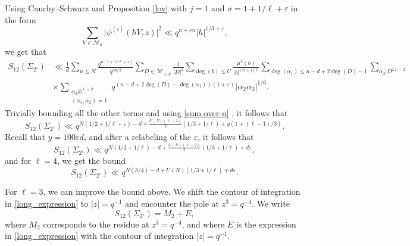 \documentclass[12pt]{amsart}
\begin{document}
Using Cauchy--Schwarz and Proposition \ref{lov} with $j=1$ and  $\sigma=1+1/\ell+\varepsilon$ in the form
$$ \sum_{V \in \mathcal{M}_n} \Big| \psi^{(i)}(hV, z)\Big|^2 \ll  q^{n+\varepsilon n} |h|^{1/3+\varepsilon},$$
we get that 
\begin{align*}
S_{12}(\Sigma_{2'}) & \ll \frac{1}{d} \sum_{n \leq N} \frac{q^{n (1+1/\ell+\varepsilon)}}{q^{3n/2}} \sum_{D \in \mathcal{M}_{\leq y}} \frac{1}{|D|^2} \sum_{\deg(b) \leq U} \frac{\mu^2(b)}{|b|^{1/2+1/\ell}} \sum_{\deg(\alpha_1) \leq n-d+2\deg(D)-1} \sum_{\alpha_2|D^{2\ell-2}} \nonumber  \\
& \times \sum_{\substack{\alpha_3|b^{\ell-2} \\ (\alpha_3,\alpha_2)=1}}  q^{(n-d+2\deg(D)-\deg(\alpha_1))(1+\varepsilon) } |\alpha_2\alpha_3|^{1/6}.
\end{align*}
Trivially bounding all the other terms and using \eqref{sum-over-n} , it follows that
\begin{equation*}
S_{12}(\Sigma_{2'}) \ll q^{N(1/2+1/\ell+\varepsilon)-d+ \frac{U(N)(\ell-2)}{2}( 1/3+1/\ell) +  y(1+(\ell-1) /3)}.
\end{equation*}
Recall that $y=100\varepsilon d$, and after a relabeling of the $\varepsilon$, it follows that
\begin{equation}
S_{12}(\Sigma_{2'}) \ll q^{N(1/2+1/\ell)-d+ \frac{U(N)(\ell-2)}{2}( 1/3+1/\ell) + d \varepsilon},
\label{ssigma3}
\end{equation}
and for $\ell=4$, we get the bound
\begin{equation*}
S_{12}(\Sigma_{2'}) \ll q^{N(3/4)-d+ U(N) ( 1/3+1/\ell) + d \varepsilon}.
\end{equation*}


For $\ell=3$, we can improve the bound above. We shift the contour of integration in \eqref{long_expression} to  $|z|=q^{-1}$ and encounter the pole at $z^3=q^{-4}$. We write 
\begin{equation}
\label{s2_mt}
S_{12}(\Sigma_{2'}) = M_2+E,
\end{equation} where $M_2$ corresponds to the residue at $z^3=q^{-4}$, and where $E$ is the expression in \eqref{long_expression} with the contour of integration $|z|=q^{-1}$.
 
 
\end{document}
